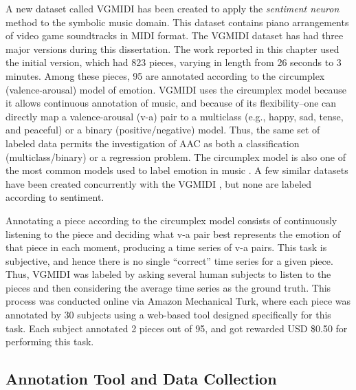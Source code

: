 A new dataset called VGMIDI has been created to apply the \textit{sentiment neuron} \cite{radford_2017} method to the symbolic music domain. This dataset contains piano arrangements of video game soundtracks in MIDI format. The VGMIDI dataset has had three major versions during this dissertation. The work reported in this chapter used the initial version, which had 823 pieces, varying in length from 26 seconds to 3 minutes.
Among these pieces, 95 are annotated according to the circumplex (valence-arousal) model of emotion. VGMIDI uses the circumplex model because it allows continuous annotation of music, and because of its flexibility--one can directly map a valence-arousal (v-a) pair to a multiclass (e.g., happy, sad, tense, and peaceful) or a binary (positive/negative) model. Thus, the same set of labeled data permits the investigation of AAC as both a classification (multiclass/binary) or a regression problem. The circumplex model is also one of the most common models used to label emotion in music \cite{Soleymani_2013}. A few similar datasets have been created concurrently with the VGMIDI \cite{madhok2018sentimozart, tan2020automated, zhao2019emotional}, but none are labeled according to sentiment.

Annotating a piece according to the circumplex model consists of continuously listening to the piece and deciding what v-a pair best represents the emotion of that piece in each moment, producing a time series of v-a pairs. This task is subjective, and hence there is no single ``correct'' time series for a given piece. Thus, VGMIDI was labeled by asking several human subjects to listen to the pieces and then considering the average time series as the ground truth. This process was conducted online via Amazon Mechanical Turk, where each piece was annotated by 30 subjects using a web-based tool designed specifically for this task. Each subject annotated 2 pieces out of 95, and got rewarded USD \$0.50 for performing this task.

\subsection{Annotation Tool and Data Collection}
\label{sec:data_collection}

